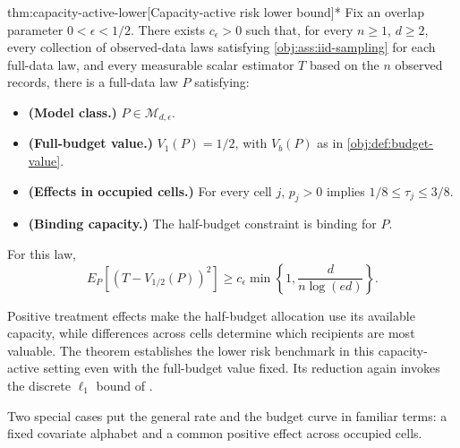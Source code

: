 \begin{theoremv}{thm:capacity-active-lower}[Capacity-active risk lower bound]*
Fix an overlap parameter \(0<\epsilon<1/2\). There exists \(c_\epsilon>0\) such that, for every \(n\geq1\), \(d\geq2\), every collection of observed-data laws satisfying \cref{obj:ass:iid-sampling} for each full-data law, and every measurable scalar estimator \(T\) based on the \(n\) observed records, there is a full-data law \(P\) satisfying:
\begin{itemize}
\item \textbf{(Model class.)} \(P\in\mathcal M_{d,\epsilon}\).
\item \textbf{(Full-budget value.)} \(V_1(P)=1/2\), with \(V_b(P)\) as in \cref{obj:def:budget-value}.
\item \textbf{(Effects in occupied cells.)} For every cell \(j\), \(p_j>0\) implies \(1/8\leq\tau_j\leq3/8\).
\item \textbf{(Binding capacity.)} The half-budget constraint is binding for \(P\).
\end{itemize}
For this law,
\[
E_P\!\left[(T-V_{1/2}(P))^2\right]
\geq c_\epsilon\min\left\{1,\frac{d}{n\log(ed)}\right\}.
\]
\end{theoremv}

Positive treatment effects make the half-budget allocation use its available capacity, while differences across cells determine which recipients are most valuable. The theorem establishes the lower risk benchmark in this capacity-active setting even with the full-budget value fixed. Its reduction again invokes the discrete \(\ell_1\) bound of \citet[Theorem~3 and the unknown-both-distributions reduction following Theorem~6]{JiaoHanWeissman2018}.

Two special cases put the general rate and the budget curve in familiar terms: a fixed covariate alphabet and a common positive effect across occupied cells.

